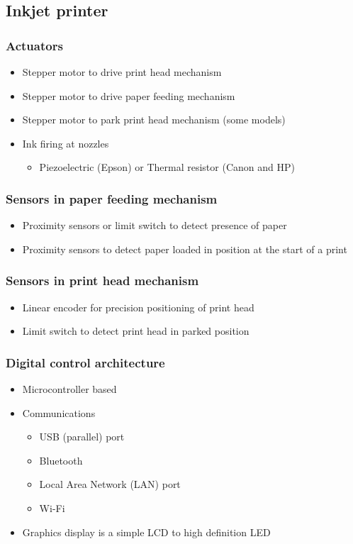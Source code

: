 \documentclass[11pt]{article}
\begin{document}
\subsection{Inkjet printer}
\label{sec:org53d5099}

\subsubsection{Actuators}
\label{sec:org7321ebd}
\begin{itemize}
\item Stepper motor to drive print head mechanism
\item Stepper motor to drive paper feeding mechanism
\item Stepper motor to park print head mechanism (some models)
\item Ink firing at nozzles
\begin{itemize}
\item Piezoelectric (Epson) or Thermal resistor (Canon and HP)
\end{itemize}
\end{itemize}
\subsubsection{Sensors in paper feeding mechanism}
\label{sec:org47804ee}
\begin{itemize}
\item Proximity sensors or limit switch to detect presence of paper
\item Proximity sensors to detect paper loaded in position at the start of a print
\end{itemize}
\subsubsection{Sensors in print head mechanism}
\label{sec:org33a0f83}
\begin{itemize}
\item Linear encoder for precision positioning of print head
\item Limit switch to detect print head in parked position
\end{itemize}
\subsubsection{Digital control architecture}
\label{sec:org881f3b8}
\begin{itemize}
\item Microcontroller based
\item Communications
\begin{itemize}
\item USB (parallel) port
\item Bluetooth
\item Local Area Network (LAN) port
\item Wi-Fi
\end{itemize}
\item Graphics display is a simple LCD to high definition LED
\end{itemize}
\end{document}
